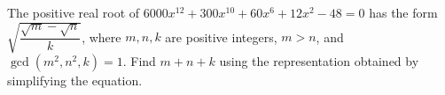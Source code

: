 The positive real root of $6000x^{12}+300x^{10}+60x^6+12x^2-48=0$ has the form $\sqrt{\dfrac{\sqrt m-\sqrt n}{k}}$, where $m,n,k$ are positive integers, $m>n$, and $\gcd(m^2,n^2,k)=1$. Find $m+n+k$ using the representation obtained by simplifying the equation.
